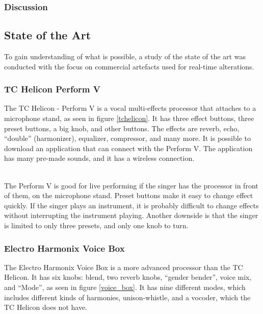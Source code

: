 \subsubsection{Discussion}




\subsection{State of the Art}
To gain understanding of what is possible, a study of the state of the art was conducted with the focus on commercial artefacts used for real-time alterations.

\subsubsection{TC Helicon Perform V}

The TC Helicon - Perform V is a vocal multi-effects processor that attaches to a microphone stand, as seen in figure \ref{tchelicon}\citep{TC}. It has three effect buttons, three preset buttons, a big knob, and other buttons. The effects are reverb, echo, “double” (harmonizer), equalizer, compressor, and many more. It is possible to download an application that can connect with the Perform V. The application has many pre-made sounds, and it has a wireless connection. \\

\begin{minipage}{\linewidth}%
\label{tchelicon}
\end{minipage}\\

The Perform V is good for live performing if the singer has the processor in front of them, on the microphone stand. Preset buttons make it easy to change effect quickly. 
If the singer plays an instrument, it is probably difficult to change effects without interrupting the instrument playing. Another downside is that the singer is limited to only three presets, and only one knob to turn.

\subsubsection{Electro Harmonix Voice Box}

The Electro Harmonix Voice Box is a more advanced processor than the TC Helicon\citep{VoiceBox}. It has six knobs: blend, two reverb knobs, “gender bender”, voice mix, and “Mode”, as seen in figure \ref{voice_box}. It has nine different modes, which includes different kinds of harmonies, unison-whistle, and a vocoder, which the TC Helicon does not have.\\

